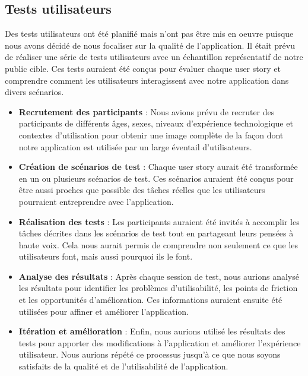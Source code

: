 \subsection{Tests utilisateurs}

Des tests utilisateurs ont été planifié mais n'ont pas être mis en oeuvre puisque nous avons décidé de nous focaliser sur la qualité de l'application. Il était prévu de réaliser une série de tests utilisateurs avec un échantillon représentatif de notre public cible. Ces tests auraient été conçus pour évaluer chaque user story et comprendre comment les utilisateurs interagissent avec notre application dans divers scénarios.

\begin{itemize}
    \item \textbf{Recrutement des participants} : Nous avions prévu de recruter des participants de différents âges, sexes, niveaux d'expérience technologique et contextes d'utilisation pour obtenir une image complète de la façon dont notre application est utilisée par un large éventail d'utilisateurs.
    \item \textbf{Création de scénarios de test} : Chaque user story aurait été transformée en un ou plusieurs scénarios de test. Ces scénarios auraient été conçus pour être aussi proches que possible des tâches réelles que les utilisateurs pourraient entreprendre avec l'application.
    \item \textbf{Réalisation des tests} : Les participants auraient été invités à accomplir les tâches décrites dans les scénarios de test tout en partageant leurs pensées à haute voix. Cela nous aurait permis de comprendre non seulement ce que les utilisateurs font, mais aussi pourquoi ils le font.
    \item \textbf{Analyse des résultats} :  Après chaque session de test, nous aurions analysé les résultats pour identifier les problèmes d'utilisabilité, les points de friction et les opportunités d'amélioration. Ces informations auraient ensuite été utilisées pour affiner et améliorer l'application.
    \item \textbf{Itération et amélioration} : Enfin, nous aurions utilisé les résultats des tests pour apporter des modifications à l'application et améliorer l'expérience utilisateur. Nous aurions répété ce processus jusqu'à ce que nous soyons satisfaits de la qualité et de l'utilisabilité de l'application.
\end{itemize}

